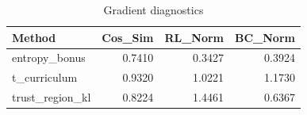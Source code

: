 \begin{table}[htbp]
\centering
\caption{Gradient diagnostics}
\label{tab:grad-diag}
\begin{tabular}{lrrr}
\toprule
\textbf{Method} & \textbf{Cos\_Sim} & \textbf{RL\_Norm} & \textbf{BC\_Norm} \\
\midrule
entropy\_bonus & 0.7410 & 0.3427 & 0.3924 \\
t\_curriculum & 0.9320 & 1.0221 & 1.1730 \\
trust\_region\_kl & 0.8224 & 1.4461 & 0.6367 \\
\bottomrule
\end{tabular}
\end{table}